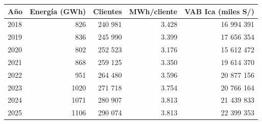 
\begin{tabular}{lrrrr}
\toprule
Año & Energía (GWh) & Clientes & MWh/cliente & VAB Ica (miles S/)\\
\midrule
2018 & 826 & 240 981 & 3.428 & 16 994 391\\
2019 & 836 & 245 990 & 3.399 & 17 656 354\\
2020 & 802 & 252 523 & 3.176 & 15 612 472\\
2021 & 868 & 259 125 & 3.350 & 19 614 370\\
2022 & 951 & 264 480 & 3.596 & 20 877 156\\
2023 & 1020 & 271 718 & 3.754 & 20 766 164\\
2024 & 1071 & 280 907 & 3.813 & 21 439 833\\
2025 & 1106 & 290 074 & 3.813 & 22 399 353\\
\bottomrule
\end{tabular}
